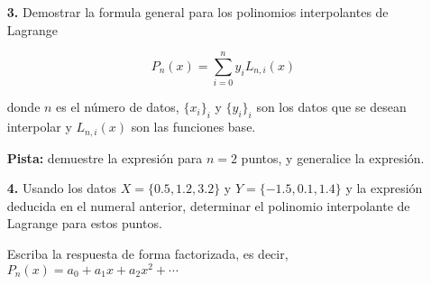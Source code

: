 \documentclass[a4,useAMS,usenatbib,usegraphicx,12pt]{article}
\begin{document}
\begin{itemize}
 \item[\textbf{3.}] 
 Demostrar la formula general para los polinomios interpolantes de Lagrange
 
 \[P_n(x) = \sum_{i=0}^n y_i L_{n,i}(x)\]
 
 donde $n$ es el número de datos, $\{x_i\}_i$ y $\{y_i\}_i$ son los datos que se 
 desean interpolar y $L_{n,i}(x)$ son las funciones base.
 
 \textbf{Pista:} demuestre la expresión para $n=2$ puntos, y generalice la 
 expresión.

 \item[\textbf{4.}] 
 Usando los datos $X = \{0.5, 1.2, 3.2\}$ y $Y = \{-1.5, 0.1, 1.4\}$ y la 
 expresión deducida en el numeral anterior, determinar el polinomio interpolante 
 de Lagrange para estos puntos. 
 
 Escriba la respuesta de forma factorizada, es decir, $P_n(x) = a_0 + a_1 x + 
 a_2 x^2+\cdots$
 
\end{itemize}

\end{document}
